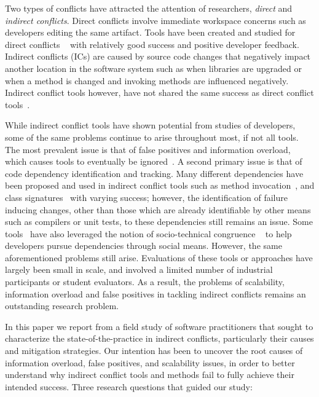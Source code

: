 \documentclass[conference]{IEEEtran}
\begin{document}
Two types of conflicts have attracted the attention of researchers, \textit{direct} and
\textit{indirect conflicts}. Direct conflicts involve immediate workspace concerns such as developers editing the same
artifact. Tools have been created and studied for direct conflicts
~\cite{Xiang:2008:ERT, Biehl:2007:FVD, Sarma:2009:TIV, Khurana:2009:PFC} with relatively good success and
positive developer feedback. Indirect conflicts (ICs) are caused by source code changes that negatively impact another
location in the software system such as when libraries are upgraded or when a method is changed
and invoking methods are influenced negatively. Indirect conflict tools however, have
not shared the same success as direct conflict
tools~\cite{Sarma:2007:TSA, Holmes:2010:CAR, Trainer:2005:BGT, Servant:2010:CPI, Borici:2012:CHA}.

While indirect conflict tools have shown potential from studies of developers, some of the same problems continue
to arise throughout most, if not all tools. The most prevalent issue is that of false positives and information
overload, which causes tools to eventually be
ignored~\cite{Sarma:2007:TSA, Servant:2010:CPI}. A second primary issue is that of code dependency identification and
tracking. Many different dependencies have been proposed and used in indirect conflict tools such as method
invocation~\cite{Trainer:2005:BGT}, and class signatures~\cite{Sarma:2007:TSA} with varying success; however, the
identification of failure inducing changes, other than those which are already identifiable by other means such
as compilers or unit tests, to these dependencies still remains an issue.
Some tools~\cite{Kwan:2011:ESC, Begel:2010:CDE, Borici:2012:CHA} have also leveraged the notion of socio-technical congruence ~\cite{Cataldo:2006:ICR} to help developers pursue dependencies through social means.
However, the same aforementioned problems still arise. Evaluations of these tools or approaches have largely been small in scale, and involved a limited number of industrial participants or student evaluators. As a result, the problems of scalability, information overload and false positives in tackling indirect conflicts remains an outstanding research problem.

In this paper we report from a field study of software practitioners that sought to characterize the state-of-the-practice in indirect conflicts, particularly their causes and mitigation strategies. Our intention has been to uncover the root causes of information overload, false positives, and
scalability issues, in order to better understand why indirect conflict tools and methods fail to fully achieve
their intended success. Three research questions that guided our study:
\end{document}
